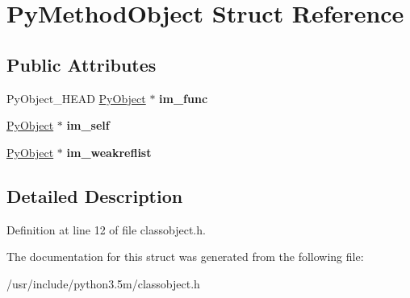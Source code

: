 \hypertarget{structPyMethodObject}{}\section{Py\+Method\+Object Struct Reference}
\label{structPyMethodObject}
\subsection*{Public Attributes}
\begin{DoxyCompactItemize}
\item 
Py\+Object\+\_\+\+H\+E\+AD \hyperlink{struct__object}{Py\+Object} $\ast$ {\bfseries im\+\_\+func}\hypertarget{structPyMethodObject_a94a16dd58736bda5aff3a5441de6fd40}{}\label{structPyMethodObject_a94a16dd58736bda5aff3a5441de6fd40}

\item 
\hyperlink{struct__object}{Py\+Object} $\ast$ {\bfseries im\+\_\+self}\hypertarget{structPyMethodObject_ab269f412ca4beb02b3c3c08ba1732ba5}{}\label{structPyMethodObject_ab269f412ca4beb02b3c3c08ba1732ba5}

\item 
\hyperlink{struct__object}{Py\+Object} $\ast$ {\bfseries im\+\_\+weakreflist}\hypertarget{structPyMethodObject_a723bb6933db81c59f188d65d3156101d}{}\label{structPyMethodObject_a723bb6933db81c59f188d65d3156101d}

\end{DoxyCompactItemize}


\subsection{Detailed Description}


Definition at line 12 of file classobject.\+h.



The documentation for this struct was generated from the following file\+:\begin{DoxyCompactItemize}
\item 
/usr/include/python3.\+5m/classobject.\+h\end{DoxyCompactItemize}
